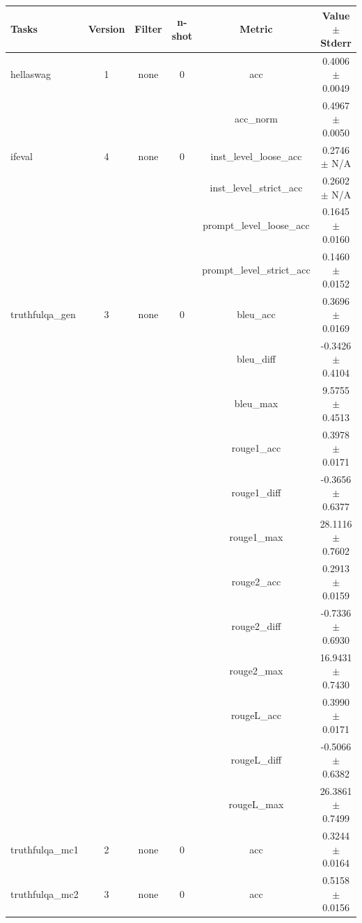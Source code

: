 \documentclass{ifacconf}
\begin{document}
\begin{strip}
\begin{minipage}{\textwidth}
    \begin{table}[H]
    \centering
    \begin{tabular}{|l|c|c|c|c|c|}
    \hline
    \textbf{Tasks} & \textbf{Version} & \textbf{Filter} & \textbf{n-shot} & \textbf{Metric} & \textbf{Value} $\pm$ \textbf{Stderr} \\ \hline
    hellaswag & 1 & none & 0 & acc & 0.4006 $\pm$ 0.0049 \\ \hline
    & & & & acc\_norm & 0.4967 $\pm$ 0.0050 \\ \hline
    ifeval & 4 & none & 0 & inst\_level\_loose\_acc & 0.2746 $\pm$ N/A \\ \hline
    & & & & inst\_level\_strict\_acc & 0.2602 $\pm$ N/A \\ \hline
    & & & & prompt\_level\_loose\_acc & 0.1645 $\pm$ 0.0160 \\ \hline
    & & & & prompt\_level\_strict\_acc & 0.1460 $\pm$ 0.0152 \\ \hline
    truthfulqa\_gen & 3 & none & 0 & bleu\_acc & 0.3696 $\pm$ 0.0169 \\ \hline
    & & & & bleu\_diff & -0.3426 $\pm$ 0.4104 \\ \hline
    & & & & bleu\_max & 9.5755 $\pm$ 0.4513 \\ \hline
    & & & & rouge1\_acc & 0.3978 $\pm$ 0.0171 \\ \hline
    & & & & rouge1\_diff & -0.3656 $\pm$ 0.6377 \\ \hline
    & & & & rouge1\_max & 28.1116 $\pm$ 0.7602 \\ \hline
    & & & & rouge2\_acc & 0.2913 $\pm$ 0.0159 \\ \hline
    & & & & rouge2\_diff & -0.7336 $\pm$ 0.6930 \\ \hline
    & & & & rouge2\_max & 16.9431 $\pm$ 0.7430 \\ \hline
    & & & & rougeL\_acc & 0.3990 $\pm$ 0.0171 \\ \hline
    & & & & rougeL\_diff & -0.5066 $\pm$ 0.6382 \\ \hline
    & & & & rougeL\_max & 26.3861 $\pm$ 0.7499 \\ \hline
    truthfulqa\_mc1 & 2 & none & 0 & acc & 0.3244 $\pm$ 0.0164 \\ \hline
    truthfulqa\_mc2 & 3 & none & 0 & acc & 0.5158 $\pm$ 0.0156 \\ \hline
    \end{tabular}
    \label{tab:qwen25_pruned}
    \end{table}
\end{minipage}
\end{strip}
\end{document}
